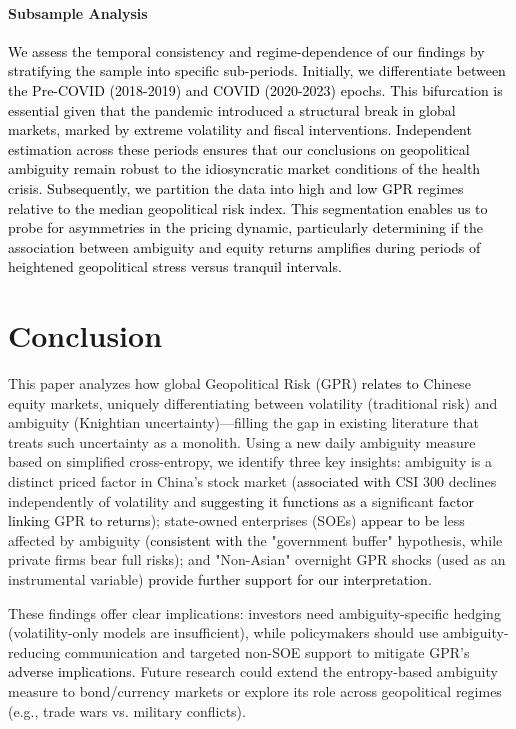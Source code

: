 \documentclass[preprint,12pt,authoryear]{elsarticle}
\begin{document}
\paragraph{Subsample Analysis} \textcolor{black}{We assess the temporal consistency and regime-dependence of our findings by stratifying the sample into specific sub-periods. Initially, we differentiate between the Pre-COVID (2018-2019) and COVID (2020-2023) epochs. This bifurcation is essential given that the pandemic introduced a structural break in global markets, marked by extreme volatility and fiscal interventions. Independent estimation across these periods ensures that our conclusions on geopolitical ambiguity remain robust to the idiosyncratic market conditions of the health crisis. Subsequently, we partition the data into high and low GPR regimes relative to the median geopolitical risk index. This segmentation enables us to probe for asymmetries in the pricing dynamic, particularly determining if the \textcolor{black}{association between} ambiguity \textcolor{black}{and} equity returns amplifies during periods of heightened geopolitical stress versus tranquil intervals.}


\section{Conclusion}
\label{sec:conclusion}

This paper analyzes how global Geopolitical Risk (GPR) \textcolor{black}{relates to} Chinese equity markets, uniquely differentiating between volatility (traditional risk) and ambiguity (Knightian uncertainty)—filling the gap in existing literature that treats such uncertainty as a monolith. Using a new daily ambiguity measure based on simplified cross-entropy, we identify three key insights: ambiguity is a distinct priced factor in China’s stock market (\textcolor{black}{associated with} CSI 300 declines independently of volatility and \textcolor{black}{suggesting it functions as a} significant \textcolor{black}{factor linking} GPR \textcolor{black}{to returns}); state-owned enterprises (SOEs) \textcolor{black}{appear to be} less affected by ambiguity (\textcolor{black}{consistent with} the "government buffer" hypothesis, while private firms bear full risks); and "Non-Asian" overnight GPR shocks (used as an instrumental variable) \textcolor{black}{provide further support for our interpretation}.

These findings offer clear implications: investors need ambiguity-specific hedging (volatility-only models are insufficient), while policymakers should use ambiguity-reducing communication and targeted non-SOE support to mitigate GPR’s \textcolor{black}{adverse implications}. Future research could extend the entropy-based ambiguity measure to bond/currency markets or explore its role across geopolitical regimes (e.g., trade wars vs. military conflicts).
\end{document}
